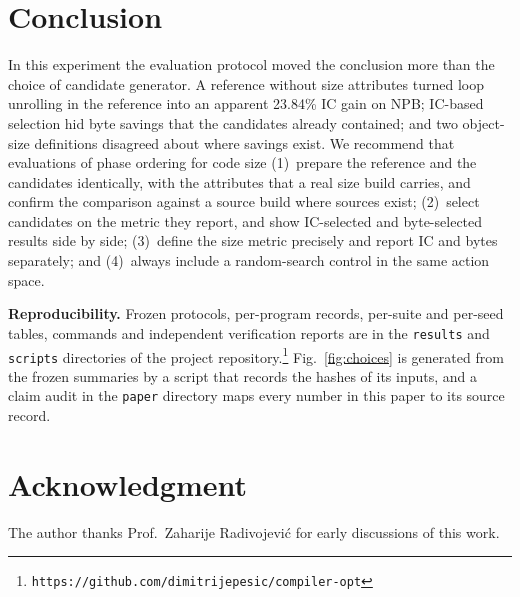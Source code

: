 \documentclass[conference,a4paper]{IEEEtran}
\begin{document}
\section{Conclusion}
In this experiment the evaluation protocol moved the conclusion more
than the choice of candidate generator. A reference without size
attributes turned loop unrolling in the reference into an apparent
23.84\% IC gain on NPB; IC-based selection hid byte savings that the
candidates already contained; and two object-size definitions
disagreed about where savings exist. We recommend that evaluations of
phase ordering for code size (1)~prepare the reference and the
candidates identically, with the attributes that a real size build
carries, and confirm the comparison against a source build where
sources exist; (2)~select candidates on the metric they report, and
show IC-selected and byte-selected results side by side; (3)~define
the size metric precisely and report IC and bytes separately; and
(4)~always include a random-search control in the same action space.

\textbf{Reproducibility.} Frozen protocols, per-program records,
per-suite and per-seed tables, commands and independent verification
reports are in the \texttt{results} and \texttt{scripts} directories of
the project repository.\footnote{\raggedright
\texttt{https://github.com/dimitrijepesic/compiler-opt}}
Fig.~\ref{fig:choices} is generated from the frozen summaries by a
script that records the hashes of its inputs, and a claim audit in the
\texttt{paper} directory maps every number in this paper to its source
record.

\section*{Acknowledgment}
The author thanks Prof.~Zaharije Radivojevi\'c for early discussions of this
work.



\end{document}

